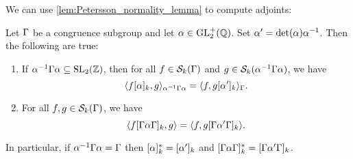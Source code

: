       We can use \cref{lem:Petersson_normality_lemma} to compute adjoints:

      \begin{proposition}\label{prop:Petersson_adjoint_modular}
        Let $\Gamma$ be a congruence subgroup and let $\alpha \in \mathrm{GL}_{2}^{+}(\mathbb{Q})$. Set $\alpha' = \det(\alpha)\alpha^{-1}$. Then the following are true:
        \begin{enumerate}[label=(\roman*)]
          \item If $\alpha^{-1}\Gamma\alpha \subseteq \mathrm{SL}_{2}(\mathbb{Z})$, then for all $f \in \mathcal{S}_{k}(\Gamma)$ and $g \in \mathcal{S}_{k}(\alpha^{-1}\Gamma\alpha)$, we have
          \[
            \langle f[\alpha]_{k},g\rangle_{\alpha^{-1}\Gamma\alpha} = \langle f,g[\alpha']_{k}\rangle_{\Gamma}.
          \]
          \item For all $f,g \in \mathcal{S}_{k}(\Gamma)$, we have
          \[
            \langle f[\Gamma\alpha\Gamma]_{k},g\rangle = \langle f,g[\Gamma\alpha'\Gamma]_{k}\rangle.
          \]
        \end{enumerate}
        In particular, if $\alpha^{-1}\Gamma\alpha = \Gamma$ then $[\alpha]_{k}^{\ast} = [\alpha']_{k}$ and $[\Gamma\alpha\Gamma]_{k}^{\ast} = [\Gamma\alpha'\Gamma]_{k}$.   
      \end{proposition}
